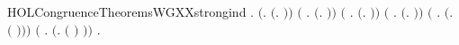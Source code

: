 \begin{SaveVerbatim}{HOLCongruenceTheoremsWGXXstrongind}
\HOLTokenTurnstile{} \HOLSymConst{\HOLTokenForall{}}.
       \ensuremath{(}\HOLSymConst{\HOLTokenForall{}}.  \ensuremath{(}\HOLTokenLambda{}. \ensuremath{)}\ensuremath{)} \HOLSymConst{\HOLTokenConj{}} \ensuremath{(}\HOLSymConst{\HOLTokenForall{}} .   \HOLSymConst{\HOLTokenImp{}}  \ensuremath{(}\HOLTokenLambda{}. \HOLSymConst{\ensuremath{\ldotp}} \ensuremath{)}\ensuremath{)} \HOLSymConst{\HOLTokenConj{}}
       \ensuremath{(}\HOLSymConst{\HOLTokenForall{}} .
              \HOLSymConst{\HOLTokenConj{}}   \HOLSymConst{\HOLTokenConj{}}   \HOLSymConst{\HOLTokenConj{}}   \HOLSymConst{\HOLTokenImp{}}
             \ensuremath{(}\HOLTokenLambda{}.   \HOLSymConst{\ensuremath{+}}  \ensuremath{)}\ensuremath{)} \HOLSymConst{\HOLTokenConj{}}
       \ensuremath{(}\HOLSymConst{\HOLTokenForall{}} .
              \HOLSymConst{\HOLTokenConj{}}   \HOLSymConst{\HOLTokenConj{}}   \HOLSymConst{\HOLTokenConj{}}   \HOLSymConst{\HOLTokenImp{}}
             \ensuremath{(}\HOLTokenLambda{}.   \HOLSymConst{\ensuremath{\mid}}  \ensuremath{)}\ensuremath{)} \HOLSymConst{\HOLTokenConj{}}
       \ensuremath{(}\HOLSymConst{\HOLTokenForall{}} .   \HOLSymConst{\HOLTokenConj{}}   \HOLSymConst{\HOLTokenImp{}}  \ensuremath{(}\HOLTokenLambda{}.   \ensuremath{(} \ensuremath{)}\ensuremath{)}\ensuremath{)} \HOLSymConst{\HOLTokenConj{}}
       \ensuremath{(}\HOLSymConst{\HOLTokenForall{}} .   \HOLSymConst{\HOLTokenConj{}}   \HOLSymConst{\HOLTokenImp{}}  \ensuremath{(}\HOLTokenLambda{}.  \ensuremath{(} \ensuremath{)} \ensuremath{)}\ensuremath{)} \HOLSymConst{\HOLTokenImp{}}
       \HOLSymConst{\HOLTokenForall{}}.   \HOLSymConst{\HOLTokenImp{}}  
\end{SaveVerbatim}
